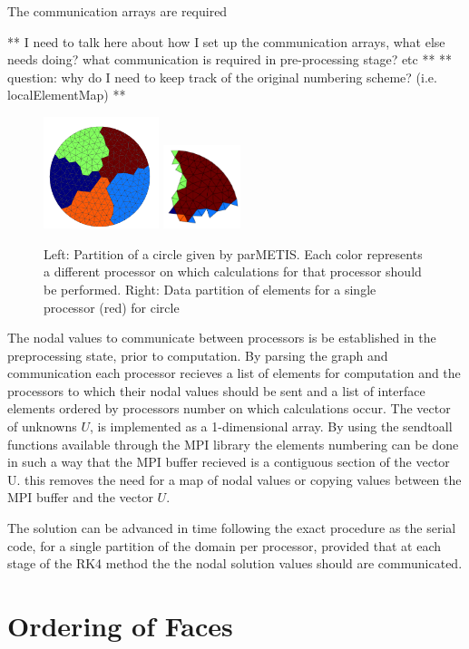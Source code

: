 The communication arrays are required

** I need to talk here about how I set up the communication arrays, what else needs doing? what communication is required in pre-processing stage? etc **
** question: why do I need to keep track of the original numbering scheme? (i.e. localElementMap) **

\begin{figure}[htbp!]
 \centering
 \includegraphics[width=0.3\textwidth]{Figures/Parallelisation/parmetisPartition}
 \includegraphics[width=0.2\textwidth]{Figures/Parallelisation/parmetisDataPartition}
\caption{Left: Partition of a circle given by parMETIS. Each color represents a different processor on which calculations for that processor should be performed. Right: Data partition of elements for a single processor (red) for circle}
\label{parmetis-figure}
\end{figure}

The nodal values to communicate between processors is be established in the preprocessing state, prior to computation. By parsing the graph and communication each processor recieves a list of elements for computation and the processors to which their nodal values should be sent and a list of interface elements ordered by processors number on which calculations occur. The vector of unknowns $U$, is implemented as a 1-dimensional array. By using the sendtoall functions available through the MPI library the elements numbering can be done in such a way that the MPI buffer recieved is a contiguous section of the vector U. this removes the need for a map of nodal values or copying values between the MPI buffer and the vector $U$.

The solution can be advanced in time following the exact procedure as the serial code, for a single partition of the domain per processor, provided that at each stage of the RK4 method the the nodal solution values should are communicated.

\section{Ordering of Faces}
